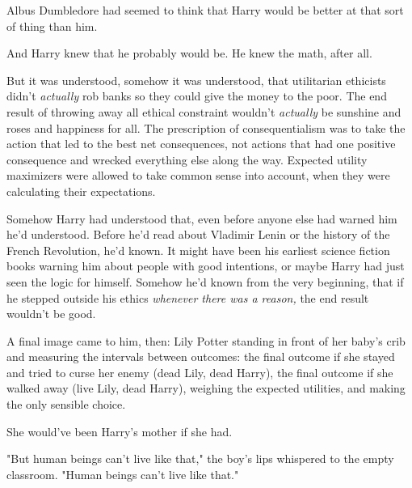 Albus Dumbledore had seemed to think that Harry would be better at that sort of 
thing than him.

And Harry knew that he probably would be. He knew the math, after all.

But it was understood, somehow it was understood, that utilitarian ethicists 
didn't \emph{actually} rob banks so they could give the money to the poor. The 
end result of throwing away all ethical constraint wouldn't \emph{actually} be 
sunshine and roses and happiness for all. The prescription of consequentialism 
was to take the action that led to the best net consequences, not actions that 
had one positive consequence and wrecked everything else along the way. 
Expected utility maximizers were allowed to take common sense into account, 
when they were calculating their expectations.

Somehow Harry had understood that, even before anyone else had warned him he'd 
understood. Before he'd read about Vladimir Lenin or the history of the French 
Revolution, he'd known. It might have been his earliest science fiction books 
warning him about people with good intentions, or maybe Harry had just seen the 
logic for himself. Somehow he'd known from the very beginning, that if he 
stepped outside his ethics \emph{whenever there was a reason,} the end result 
wouldn't be good.

A final image came to him, then: Lily Potter standing in front of her baby's 
crib and measuring the intervals between outcomes: the final outcome if she 
stayed and tried to curse her enemy (dead Lily, dead Harry), the final outcome 
if she walked away (live Lily, dead Harry), weighing the expected utilities, 
and making the only sensible choice.

She would've been Harry's mother if she had.

"But human beings can't live like that," the boy's lips whispered to the empty 
classroom. "Human beings can't live like that."